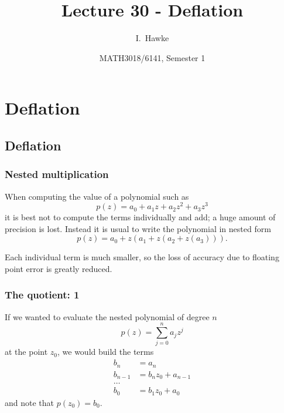 \documentclass{beamer}
\title[Lecture 30] %
{Lecture 30 - Deflation}
\author[I. Hawke] %
{I.~Hawke}
\institute[University of Southampton] %
{
  School of Mathematics, \\
  University of Southampton, UK
}
\date[Semester 1] %
{MATH3018/6141, Semester 1}
\begin{document}
\begin{frame}
  \titlepage
\end{frame}


\section{Deflation}

\subsection{Deflation}

\begin{frame}
  \frametitle{Nested multiplication}

  When computing the value of a polynomial such as
  \begin{equation*}
    p(z) = a_0 + a_1 z + a_2 z^2 + a_3 z^3
  \end{equation*}
  it is best not to compute the terms individually and add; a huge
  amount of precision is lost. \pause Instead it is usual to write the
  polynomial in nested form
  \begin{equation*}
    p(z) = a_0 + z \left( a_1 + z \left( a_2 + z \left( a_3 \right)
      \right) \right).
  \end{equation*} \pause

  Each individual term is much smaller, so the loss of accuracy due to
  floating point error is greatly reduced.

\end{frame}

\begin{frame}
  \frametitle{The quotient: 1}

  If we wanted to evaluate the nested polynomial of degree $n$
  \begin{equation*}
    p(z) = \sum_{j=0}^n a_j z^j
  \end{equation*}
  at the point $z_0$, we would build the terms
  \begin{align*}
    b_n & = a_n \\
    b_{n-1} & = b_n z_0 + a_{n-1} \\
    \dots \\
    b_0 & = b_1 z_0 + a_0
  \end{align*}
  and note that $p(z_0) = b_0$.

\end{frame}
\end{document}
